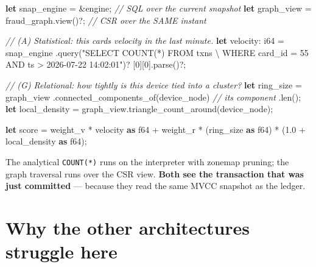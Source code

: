 \documentclass[
  11pt,
  openany]{book}
\newenvironment{Shaded}{}{}
\newcommand{\CommentTok}[1]{\textcolor[rgb]{0.38,0.63,0.69}{\textit{#1}}}
\newcommand{\DataTypeTok}[1]{\textcolor[rgb]{0.56,0.13,0.00}{#1}}
\newcommand{\DecValTok}[1]{\textcolor[rgb]{0.25,0.63,0.44}{#1}}
\newcommand{\KeywordTok}[1]{\textcolor[rgb]{0.00,0.44,0.13}{\textbf{#1}}}
\newcommand{\NormalTok}[1]{#1}
\newcommand{\OperatorTok}[1]{\textcolor[rgb]{0.40,0.40,0.40}{#1}}
\newcommand{\SpecialCharTok}[1]{\textcolor[rgb]{0.25,0.44,0.63}{#1}}
\newcommand{\StringTok}[1]{\textcolor[rgb]{0.25,0.44,0.63}{#1}}
\begin{document}
\begin{Shaded}
\begin{Highlighting}[]
\KeywordTok{let}\NormalTok{ snap\_engine }\OperatorTok{=} \OperatorTok{\&}\NormalTok{engine}\OperatorTok{;}                 \CommentTok{// SQL over the current snapshot}
\KeywordTok{let}\NormalTok{ graph\_view  }\OperatorTok{=}\NormalTok{ fraud\_graph}\OperatorTok{.}\NormalTok{view()}\OperatorTok{?;}     \CommentTok{// CSR over the SAME instant}

\CommentTok{// (A) Statistical: this card\textquotesingle{}s velocity in the last minute.}
\KeywordTok{let}\NormalTok{ velocity}\OperatorTok{:} \DataTypeTok{i64} \OperatorTok{=}\NormalTok{ snap\_engine}
    \OperatorTok{.}\NormalTok{query(}\StringTok{"SELECT COUNT(*) FROM txns }\SpecialCharTok{\textbackslash{}}
\StringTok{            WHERE card\_id = 55 AND ts \textgreater{} \textquotesingle{}2026{-}07{-}22 14:02:01\textquotesingle{}"}\NormalTok{)}\OperatorTok{?}
\NormalTok{    [}\DecValTok{0}\NormalTok{][}\DecValTok{0}\NormalTok{]}\OperatorTok{.}\NormalTok{parse()}\OperatorTok{?;}

\CommentTok{// (G) Relational: how tightly is this device tied into a cluster?}
\KeywordTok{let}\NormalTok{ ring\_size }\OperatorTok{=}\NormalTok{ graph\_view}
    \OperatorTok{.}\NormalTok{connected\_components\_of(device\_node)   }\CommentTok{// its component}
    \OperatorTok{.}\NormalTok{len()}\OperatorTok{;}
\KeywordTok{let}\NormalTok{ local\_density }\OperatorTok{=}\NormalTok{ graph\_view}\OperatorTok{.}\NormalTok{triangle\_count\_around(device\_node)}\OperatorTok{;}

\KeywordTok{let}\NormalTok{ score }\OperatorTok{=}\NormalTok{ weight\_v }\OperatorTok{*}\NormalTok{ velocity }\KeywordTok{as} \DataTypeTok{f64}
          \OperatorTok{+}\NormalTok{ weight\_r }\OperatorTok{*}\NormalTok{ (ring\_size }\KeywordTok{as} \DataTypeTok{f64}\NormalTok{) }\OperatorTok{*}\NormalTok{ (}\DecValTok{1.0} \OperatorTok{+}\NormalTok{ local\_density }\KeywordTok{as} \DataTypeTok{f64}\NormalTok{)}\OperatorTok{;}
\end{Highlighting}
\end{Shaded}

The analytical \texttt{COUNT(*)} runs on the interpreter with zonemap
pruning; the graph traversal runs over the CSR view. \textbf{Both see
the transaction that was just committed} --- because they read the same
MVCC snapshot as the ledger.

\section{Why the other architectures struggle
here}\label{why-the-other-architectures-struggle-here}
\end{document}
